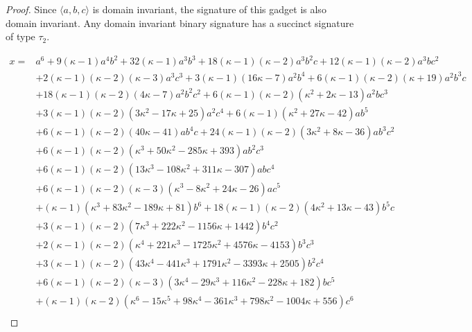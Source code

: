 \documentclass[11pt]{article}
\begin{document}
\begin{proof}
 Since $\langle a,b,c \rangle$ is domain invariant,
 the signature of this gadget is also domain invariant.
 Any domain invariant binary signature has a succinct signature of type $\tau_2$.

\begin{table}[p]
 \begin{align*}
  x = {}&  a^6 + 9 (\kappa - 1) a^4 b^2
         + 32 (\kappa - 1) a^3 b^3
         + 18 (\kappa - 1) (\kappa - 2) a^3 b^2 c
         + 12 (\kappa - 1) (\kappa - 2) a^3 b c^2\\
        &+ 2 (\kappa - 1) (\kappa - 2) (\kappa - 3) a^3 c^3
         + 3 (\kappa - 1) (16 \kappa - 7) a^2 b^4
         + 6 (\kappa - 1) (\kappa - 2) (\kappa + 19) a^2 b^3 c\\
        &+ 18 (\kappa - 1) (\kappa - 2) (4 \kappa - 7) a^2 b^2 c^2
         + 6 (\kappa - 1) (\kappa - 2) (\kappa^2 + 2 \kappa - 13) a^2 b c^3\\
        &+ 3 (\kappa - 1) (\kappa - 2) (3 \kappa^2 - 17 \kappa + 25) a^2 c^4
         + 6 (\kappa - 1) (\kappa^2 + 27 \kappa - 42) a b^5\\
        &+ 6 (\kappa - 1) (\kappa - 2) (40 \kappa - 41) a b^4 c
         + 24 (\kappa - 1) (\kappa - 2) (3 \kappa^2 + 8 \kappa - 36) a b^3 c^2\\
        &+ 6 (\kappa - 1) (\kappa - 2) (\kappa^3 + 50 \kappa^2 - 285 \kappa + 393) a b^2 c^3\\
        &+ 6 (\kappa - 1) (\kappa - 2) (13 \kappa^3 - 108 \kappa^2 + 311 \kappa - 307) a b c^4\\
        &+ 6 (\kappa - 1) (\kappa - 2) (\kappa - 3) (\kappa^3 - 8 \kappa^2 + 24 \kappa - 26) a c^5\\
        &+ (\kappa - 1) (\kappa^3 + 83 \kappa^2 - 189 \kappa + 81) b^6
         + 18 (\kappa - 1) (\kappa - 2) (4 \kappa^2 + 13 \kappa - 43) b^5 c\\
        &+ 3 (\kappa - 1) (\kappa - 2) (7 \kappa^3 + 222 \kappa^2 - 1156 \kappa + 1442) b^4 c^2\\
        &+ 2 (\kappa - 1) (\kappa - 2) (\kappa^4 + 221 \kappa^3 - 1725 \kappa^2 + 4576 \kappa - 4153) b^3 c^3\\
        &+ 3 (\kappa - 1) (\kappa - 2) (43 \kappa^4 - 441 \kappa^3 + 1791 \kappa^2 - 3393 \kappa + 2505) b^2 c^4\\
        &+ 6 (\kappa - 1) (\kappa - 2) (\kappa - 3) (3 \kappa^4 - 29 \kappa^3 + 116 \kappa^2 - 228 \kappa + 182) b c^5\\
        &+ (\kappa - 1) (\kappa - 2) (\kappa^6 - 15 \kappa^5 + 98 \kappa^4 - 361 \kappa^3 + 798 \kappa^2 - 1004 \kappa + 556) c^6\\

\end{align*}
\end{table}
\end{proof}
\end{document}

